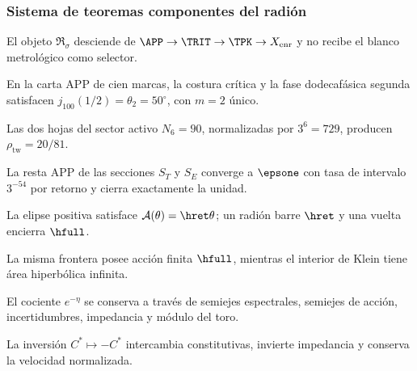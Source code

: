 \subsubsection{Sistema de teoremas componentes del radión}

\begin{theorem}[Genealogía]
El objeto \(\mathfrak R_\sigma\) desciende de
\(\APP\to\TRIT\to\TPK\to X_{\mathrm{enr}}\) y no recibe el blanco metrológico
como selector.
\end{theorem}

\begin{theorem}[Bisagra]
En la carta APP de cien marcas, la costura crítica y la fase dodecafásica
segunda satisfacen \(j_{100}(1/2)=\theta_2=50^\circ\), con \(m=2\) único.
\end{theorem}

\begin{theorem}[Densidad]
Las dos hojas del sector activo \(N_6=90\), normalizadas por \(3^6=729\),
producen \(\rho_{\mathrm{tw}}=20/81\).
\end{theorem}

\begin{theorem}[Acarreo]
La resta APP de las secciones \(S_T\) y \(S_E\) converge a
\(\epsone\) con tasa de intervalo \(3^{-54}\) por retorno y cierra exactamente
la unidad.
\end{theorem}

\begin{theorem}[Acción]
La elipse positiva satisface \(\mathcal A(\theta)=\hret\theta\); un radión
barre \(\hret\) y una vuelta encierra \(\hfull\).
\end{theorem}

\begin{theorem}
La misma frontera posee acción finita \(\hfull\), mientras el interior de
Klein tiene área hiperbólica infinita.
\end{theorem}

\begin{theorem}[Forma]
El cociente \(e^{-\eta}\) se conserva a través de semiejes espectrales,
semiejes de acción, incertidumbres, impedancia y módulo del toro.
\end{theorem}

\begin{theorem}[Polaridad]
La inversión \(C^*\mapsto-C^*\) intercambia constitutivas, invierte
impedancia y conserva la velocidad normalizada.
\end{theorem}

